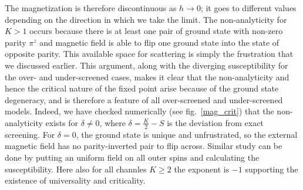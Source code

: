 \documentclass[reprint,prb,superscriptaddress]{revtex4-2}
\begin{document}
The magnetization is therefore discontinuous as \(h\to 0\); it goes to different values depending on the direction in which we take the limit. The non-analyticity for \(K>1\) occurs because there is at least one pair of ground state with non-zero parity \(\pi^z\) and magnetic field is able to flip one ground state into the state of opposite parity. This available space for scattering is simply the frustration that we discussed earlier. This argument, along with the diverging susceptibility for the over- and under-screened cases, makes it clear that {the non-analyticity and hence the critical nature of the fixed point arise because of the ground state degeneracy, and is therefore a feature of all over-screened and under-screened  models}. Indeed, we have checked numerically (see fig.~\ref{mag_crit}) that the non-analyticity exists for \(\delta \neq 0\), where \(\delta = \frac{K}{2} - S\) is the deviation from exact screening. For \(\delta=0\), the ground state is unique and unfrustrated, so the external magnetic field has no parity-inverted pair to flip across. Similar study can be done by putting an uniform field on all outer spins and calculating the susceptibility. Here also for all channles $K\geq 2$ the exponent is $-1$ supporting the existence of universality and criticality.
\end{document}
